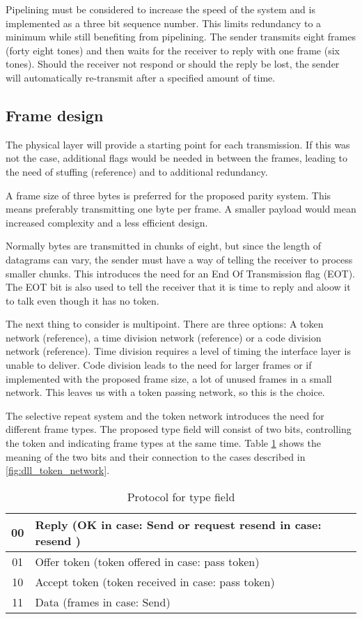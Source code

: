Pipelining \cite[p. 323]{KOM}must be considered to increase the speed of the
system and is implemented as a three bit sequence number. This limits redundancy to a minimum
while still benefiting from pipelining. The sender transmits eight frames
(forty eight tones) and then waits for the receiver to reply with one frame
(six tones). Should the receiver not respond or should the reply be lost, the
sender will automatically re-transmit after a specified amount of time.

\subsection{Frame design}\label{dll_frame_design}
The physical layer will provide a starting point for each
transmission. If this was not the case,
additional flags would be needed in between the frames, leading to the
need of stuffing (reference) and to additional redundancy.

A frame size of three bytes is preferred for the proposed parity system. This
means preferably transmitting one byte per frame. A smaller payload would mean
increased complexity and a less efficient design.

Normally bytes are transmitted in chunks of eight, but since the length of
datagrams can vary, the sender must have a way of telling the receiver to process smaller
chunks. This introduces the need for an End Of Transmission flag (EOT). The EOT
bit is also used to tell the receiver that it is time to reply and aloow it to
talk even though it has no token.

The next thing to consider is multipoint. There are three options: A token
network (reference), a time division network (reference) or a code division
network (reference). Time division requires a level of timing the interface layer
is unable to deliver. Code division leads to the need for larger frames or if implemented with the
proposed frame size, a lot of unused frames in a small network. This leaves us
with a token passing network, so this is the choice.

The selective repeat system and the token network introduces the need for
different frame types. The proposed type field will consist of two bits,
controlling the token and indicating frame types at the same time. Table
\ref{tab:protocol_for_type_field} shows the meaning of the two bits and their
connection to the cases described in \ref{fig:dll_token_network}.

\begin{table}[htb]
	\centering
	\begin{tabular}{|c|l|}
		\hline
		00 &  Reply (OK in case: Send or request resend in case: resend
		)
		\\
		\hline
		01 &  Offer token (token offered in case: pass token) \\
		\hline
		10 &  Accept token (token received in case: pass token) \\
		\hline
		11 &  Data (frames in case: Send)\\
		\hline
	\end{tabular}
	\caption{Protocol for type field}
	\label{tab:protocol_for_type_field}
\end{table}

